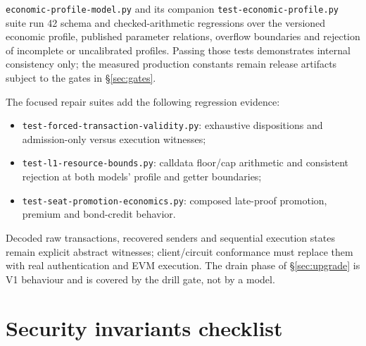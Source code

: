 \documentclass[a4paper,11pt]{article}
\newcommand{\code}[1]{\nolinkurl{#1}}
\begin{document}
\code{economic-profile-model.py} and its companion
\code{test-economic-profile.py} suite run 42 schema and checked-arithmetic
regressions over the versioned economic profile, published parameter
relations, overflow boundaries and rejection of incomplete or uncalibrated
profiles.  Passing those tests demonstrates internal consistency only; the
measured production constants remain release artifacts subject to the gates in
\S\ref{sec:gates}.

The focused repair suites add the following regression evidence:
\begin{itemize}
\item \code{test-forced-transaction-validity.py}: exhaustive dispositions and
admission-only versus execution witnesses;
\item \code{test-l1-resource-bounds.py}: calldata floor/cap arithmetic and
consistent rejection at both models' profile and getter boundaries;
\item \code{test-seat-promotion-economics.py}: composed late-proof promotion,
premium and bond-credit behavior.
\end{itemize}
Decoded raw transactions, recovered
senders and sequential execution states remain explicit abstract witnesses;
client/circuit conformance must replace them with real authentication and EVM
execution.  The drain phase of \S\ref{sec:upgrade} is V1 behaviour and is
covered by the drill gate, not by a model.

\section{Security invariants checklist}\label{app:invariants}
\end{document}
